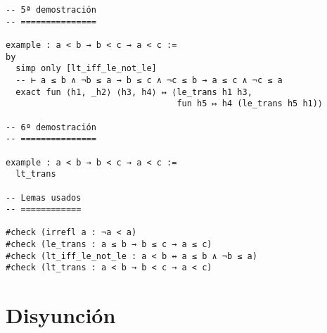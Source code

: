 \begin{verbatim}
-- 5ª demostración
-- ===============

example : a < b → b < c → a < c :=
by
  simp only [lt_iff_le_not_le]
  -- ⊢ a ≤ b ∧ ¬b ≤ a → b ≤ c ∧ ¬c ≤ b → a ≤ c ∧ ¬c ≤ a
  exact fun ⟨h1, _h2⟩ ⟨h3, h4⟩ ↦ ⟨le_trans h1 h3,
                                  fun h5 ↦ h4 (le_trans h5 h1)⟩

-- 6ª demostración
-- ===============

example : a < b → b < c → a < c :=
  lt_trans

-- Lemas usados
-- ============

#check (irrefl a : ¬a < a)
#check (le_trans : a ≤ b → b ≤ c → a ≤ c)
#check (lt_iff_le_not_le : a < b ↔ a ≤ b ∧ ¬b ≤ a)
#check (lt_trans : a < b → b < c → a < c)
\end{verbatim}

\section{Disyunción}
\label{sec:org994fb42}

